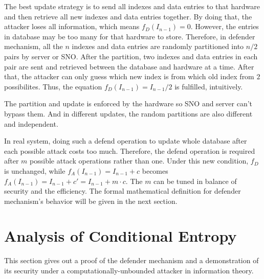 \documentclass[10pt, conference, compsocconf]{IEEEtran}
\begin{document}
        The best update strategy
        is to send all indexes and data entries to that hardware and then
        retrieve all new indexes and data entries together. By doing that, the attacker
        loses all information, which means $f_D(I_{n-1}) = 0$. However, the entries
        in database may be too many for that hardware to store. Therefore, in defender mechanism,
        all the $n$ indexes and data entries are randomly partitioned into
        $n/2$ pairs by server or SNO.
        After the partition,
        two indexes and data entries in each pair are sent and retrieved
        between the database and hardware at a time. After that, the attacker can
        only guess which new index is from which old index from $2$ possibilites.
        Thus, the equation $f_D(I_{n-1}) = I_{n-1}/2$ is fulfilled, intuitively.

        The partition and update is enforced by the hardware so SNO
        and server can't bypass them. And in
        different updates, the random partitions are also different
        and independent.


        In real system, doing such a defend operation to update whole
        database after each possible attack costs too much.
        Therefore, the defend operation is required after $m$
        possible attack operations rather than one. Under this
        new condition, $f_D$ is unchanged, while $f_A(I_{n-1}) = I_{n-1}+c$
        becomes $f_A(I_{n-1}) = I_{n-1}+c' = I_{n-1}+m \cdot c$.
        The $m$ can be tuned in balance of security and the
        efficiency. The formal mathematical definition for
        defender mechanism's behavior will be given in the
        next section.

\section{Analysis of Conditional Entropy}\label{sec_proof}
    This section gives out a proof of the defender mechanism
    and a demonstration
    of its security under a computationally-unbounded attacker
    in information theory.
\end{document}
